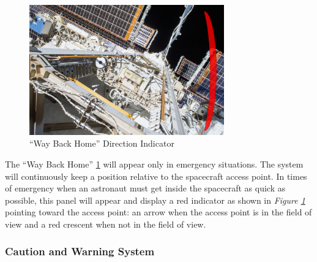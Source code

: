 \documentclass{article}
\let\Oldsubsubsection\subsubsection
\renewcommand{\subsubsection}{\FloatBarrier\Oldsubsubsection}
\begin{document}
\begin{figure}[!htb]
  \centering
  \includegraphics[width=0.75\textwidth]{assets/wayhome.png}
  \caption{“Way Back Home” Direction Indicator}
  \label{fig:wayhome}
\end{figure}

The “Way Back Home” \ref{fig:wayhome} will appear only in emergency situations. The system will continuously keep a position relative to the spacecraft access point. In times of emergency when an astronaut must get inside the spacecraft as quick as possible, this panel will appear and display a red indicator as shown in \textit{Figure \ref{fig:wayhome}} pointing toward the access point: an arrow when the access point is in the field of view and a red crescent when not in the field of view. 

\subsubsection{Caution and Warning System}
\end{document}
